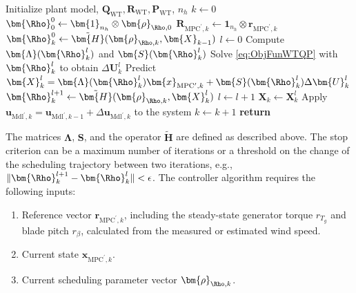 \begin{algorithm}
    \caption{qLMPC}\label{algo:qLPVMPC}
    \begin{algorithmic}[1]
        \State Initialize plant model, \(\bm{Q}_{\text{WT}}, \bm{R}_{\text{WT}}, \bm{P}_{\text{WT}}\), \(n_h\)
        \State \(k \gets 0\)
        \State \(\bm{\Rho}^0_{0} \gets \bm{1}_{n_h} \otimes \bm{\rho}_{\Rho,0}\) 
        \State \(\bm{R}_{\text{MPC}^\prime,k} \gets \bm{1}_{n_h} \otimes \bm{r}_{\text{MPC}^\prime,k}\)
        \State \(\bm{\Rho}^0_{k} \gets \tilde{\bm{H}}(\bm{\rho}_{\Rho,k}, \bm{X}_{k-1})\) 
        \EndIf
        \State \(l \gets 0\)
        \State Compute \(\bm{\Lambda}(\bm{\Rho}_k^l)\) and \(\bm{S}(\bm{\Rho}_k^l)\)
        \State Solve \eqref{eq:ObjFunWTQP} with \(\bm{\Rho}_k^l\) to obtain \(\Delta\bm{U}_k^l\)
        \State Predict \(\bm{X}_k^l = \bm{\Lambda}(\bm{\Rho}_k^l)\bm{x}_{\text{MPC}^\prime,k} + \bm{S}(\bm{\Rho}_k^l) \Delta\bm{U}_k^l\)
        \State \(\bm{\Rho}^{l+1}_{k} \gets \tilde{\bm{H}}(\bm{\rho}_{\Rho,k}, \bm{X}_k^l)\)
        \State \(l \gets l + 1\)
        \EndWhile
        \State \(\bm{X}_k \gets \bm{X}_k^{l}\) 
        \State Apply \(\bm{u}_{\text{Mdl}^\prime,k} = \bm{u}_{\text{Mdl}^\prime,k-1} + \Delta\bm{u}_{\text{Mdl}^\prime,k}\) to the system
        \State \(k \gets k + 1\)
        \EndWhile
        \State \textbf{return}
        \EndProcedure
    \end{algorithmic}
\end{algorithm}
%
The matrices \(\bm{\Lambda}\), \(\bm{S}\), and the operator \(\tilde{\bm{H}}\) are defined as described above. The stop criterion can be a maximum number of iterations or a threshold on the change of the scheduling trajectory between two iterations, e.g., $\|\bm{\Rho}_k^{l+1} - \bm{\Rho}_k^{l}\| < \epsilon$.
%
The controller algorithm requires the following inputs:
\begin{enumerate}
    \item Reference vector \(\bm{r}_{\text{MPC}^\prime,k}\), including the steady-state generator torque $r_{T_g}$ and blade pitch $r_\beta$, calculated from the measured or estimated wind speed.
    \item Current state \(\bm{x}_{\text{MPC}^\prime,k}\).
    \item Current scheduling parameter vector $\bm{\rho}_{\Rho,k}$.
\end{enumerate}
